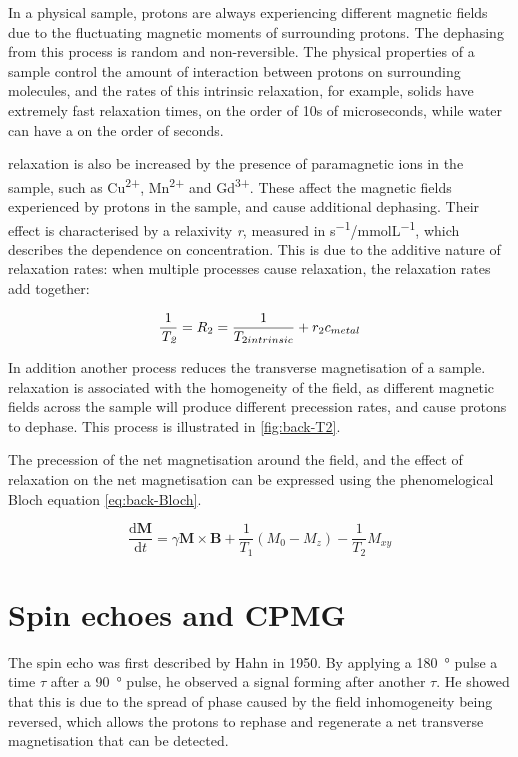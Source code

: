 In a physical sample, protons are always experiencing different magnetic fields due to the fluctuating magnetic moments of surrounding protons.
The dephasing from this process is random and non-reversible.
The physical properties of a sample control the amount of interaction between protons on surrounding molecules, and the rates of this intrinsic \Ttwo relaxation, for example, solids have extremely fast \Ttwo relaxation times, on the order of 10s of microseconds, while water can have a \Ttwo on the order of seconds.

\Ttwo relaxation is also be increased by the presence of paramagnetic ions in the sample, such as Cu\textsuperscript{2+}, Mn\textsuperscript{2+} and Gd\textsuperscript{3+}.
These affect the magnetic fields experienced by protons in the sample, and cause additional dephasing.
Their effect is characterised by a relaxivity \textit{r}, measured in \si{s^{-1}/mmolL^{-1}}, which describes the dependence on concentration.
This is due to the additive nature of relaxation rates: when multiple processes cause relaxation, the relaxation rates add together:

\begin{displaymath}
\frac{1}{\textit{T\textsubscript{2}}} = R_2 = \frac{1}{T_{2 intrinsic}} + r_{2} c_{metal}
\end{displaymath}

In addition another process reduces the transverse magnetisation of a sample.
\Ttwostar relaxation is  associated with the homogeneity of the \Bzero field, as different magnetic fields across the sample will produce different precession rates, and cause protons to dephase.
This process is illustrated in \autoref{fig:back-T2}.

The precession of the net magnetisation around the \Bzero field, and the effect of relaxation on the net magnetisation can be expressed using the phenomelogical Bloch equation \autoref{eq:back-Bloch}.

\begin{equation}
\frac{\mathrm{d}\mathbf{M}}{\mathrm{d}t} = \gamma \mathbf{M} \times \mathbf{B} + \frac{1}{T_1} (M_0 - M_z) - \frac{1}{T_2} M_{xy}
\label{eq:back-Bloch}
\end{equation}

\section{Spin echoes and CPMG}
\label{sec:back-spinecho}
The spin echo was first described by Hahn in 1950\cite{HahnSpinEchoes1950}.
By applying a \SI{180}{\degree} pulse a time $\tau$ after a \SI{90}{\degree} pulse, he observed a signal forming after another $\tau$.
He showed that this is due to the spread of phase caused by the \Bzero field inhomogeneity being reversed, which allows the protons to rephase and regenerate a net transverse magnetisation that can be detected.

